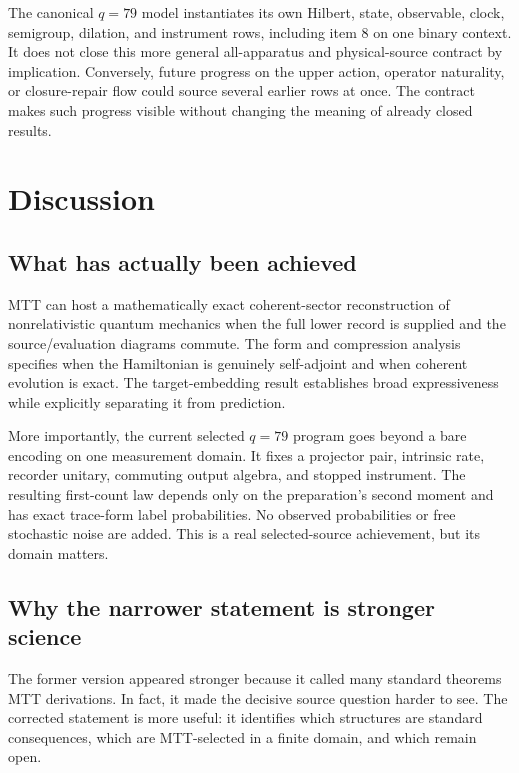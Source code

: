 \documentclass[11pt]{article}
\theoremstyle{definition}
\theoremstyle{remark}
\begin{document}
The canonical \(q=79\) model instantiates its own Hilbert, state, observable,
clock, semigroup, dilation, and instrument rows, including item 8 on one
binary context. It does not close this more general all-apparatus and
physical-source contract by implication. Conversely,
future progress on the upper action, operator naturality, or closure-repair
flow could source several earlier rows at once.  The contract makes such
progress visible without changing the meaning of already closed results.

\section{Discussion}
\label{sec:discussion}

\subsection{What has actually been achieved}

MTT can host a mathematically exact coherent-sector reconstruction of
nonrelativistic quantum mechanics when the full lower record is supplied and
the source/evaluation diagrams commute.  The form and compression analysis
specifies when the Hamiltonian is genuinely self-adjoint and when coherent
evolution is exact.  The target-embedding result establishes broad
expressiveness while explicitly separating it from prediction.

More importantly, the current selected \(q=79\) program goes beyond a bare
encoding on one measurement domain.  It fixes a projector pair, intrinsic
rate, recorder unitary, commuting output algebra, and stopped instrument.
The resulting first-count law depends only on the preparation's second
moment and has exact trace-form label probabilities.  No observed
probabilities or free stochastic noise are added.  This is a real
selected-source achievement, but its domain matters.

\subsection{Why the narrower statement is stronger science}

The former version appeared stronger because it called many standard
theorems MTT derivations.  In fact, it made the decisive source question
harder to see.  The corrected statement is more useful: it identifies which
structures are standard consequences, which are MTT-selected in a finite
domain, and which remain open.
\end{document}

